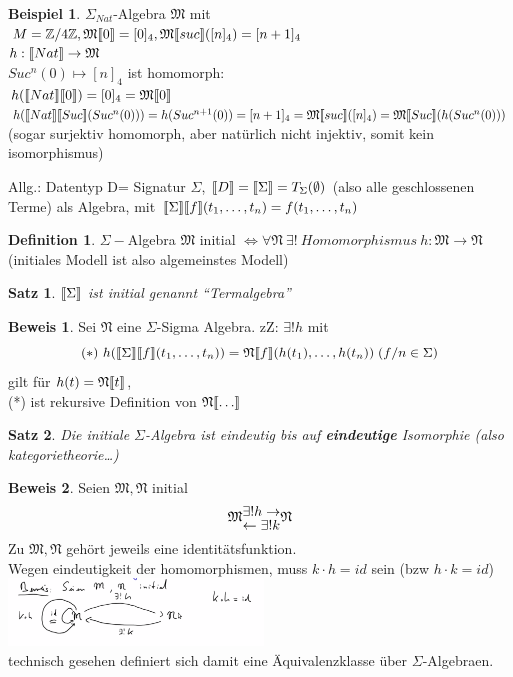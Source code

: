 \documentclass{article}
\newtheorem{satz}{Satz}
\theoremstyle{definition}
\newtheorem{beweis}{Beweis}[section]
\newtheorem{beispiel}{Beispiel}[section]
\newtheorem{definition}{Definition}[section]
\begin{document}
	\begin{beispiel} $\Sigma_{Nat}$-Algebra $\mathfrak{M}$ mit $M=\mathbb{Z}/4\mathbb{Z},\mathfrak{M}\llbracket 0\rrbracket = [0]_4, \mathfrak{M}\llbracket suc\rrbracket([n]_4) = [n+1]_4$\\
	$h:\llbracket Nat\rrbracket\to \mathfrak{M}$\\
	$Suc^n(0)\mapsto [n]_4$ ist homomorph:\\
	$h(\llbracket Nat\rrbracket\llbracket 0\rrbracket) = [0]_4 =\mathfrak{M}\llbracket 0\rrbracket$\\
	$h(\llbracket Nat\rrbracket\llbracket Suc\rrbracket(Suc^n(0)))=h(Suc^{n+1}(0)) = [n+1]_4 =\mathfrak{M}\llbracket suc\rrbracket([n]_4)=\mathfrak{M}\llbracket Suc\rrbracket(h(Suc^n(0)))$ (sogar surjektiv homomorph, aber natürlich nicht injektiv, somit kein isomorphismus)
	\end{beispiel}
	Allg.: Datentyp D= Signatur $\Sigma$, $\llbracket D\rrbracket = \llbracket \Sigma\rrbracket = T_\Sigma (\emptyset)$ (also alle geschlossenen Terme) als Algebra, mit $\llbracket \Sigma\rrbracket\llbracket f\rrbracket(t_1,\dots,t_n) = f(t_1,\dots, t_n)$\\
	\begin{definition} $\Sigma-$Algebra $\mathfrak{M}$ initial $\iff\forall \mathfrak{N}\ \exists!\ Homomorphismus\ h:\mathfrak{M}\to\mathfrak{N}$ (initiales Modell ist also algemeinstes Modell)
	\end{definition}
	\begin{satz} $\llbracket \Sigma\rrbracket$ ist initial genannt ``Termalgebra''\end{satz}
	\begin{beweis} Sei $\mathfrak{N}$ eine $\Sigma$-Sigma Algebra. zZ: $\exists! h$ mit 
	\[(*)\ h(\dbrack{\Sigma}\dbrack{f}(t_1,\dots,t_n))=\mathfrak{N}\dbrack{f}(h(t_1),\dots,h(t_n))\; (f/n\in\Sigma)\]
	gilt für $h(t)=\mathfrak{N}\llbracket t\rrbracket$,\\
	(*) ist rekursive Definition von $\mathfrak{N}\llbracket \dots\rrbracket$
	\end{beweis}
	\begin{satz} Die initiale $\Sigma$-Algebra ist eindeutig bis auf \textbf{eindeutige} Isomorphie (also kategorietheorie\dots)
	\end{satz}
	\begin{beweis} Seien $\mathfrak{M},\mathfrak{N}$ initial\\
 	\[\mathfrak{M} \stackanchor{$\exists ! h\to$}{$\gets\exists! k$}\mathfrak{N}\]
	Zu $\mathfrak{M},\mathfrak{N}$ gehört jeweils eine identitätsfunktion.\\
	Wegen eindeutigkeit der homomorphismen, muss $k\cdot h=id$ sein (bzw $h\cdot k=id$)\\
	\includegraphics[width=256px]{images/initialEindeutigkeit.png}\\
	technisch gesehen definiert sich damit eine Äquivalenzklasse über $\Sigma$-Algebraen.\\
	\end{beweis}
\end{document}

